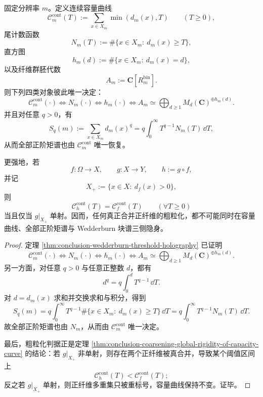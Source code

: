 \begin{theorem}\label{thm:conclusion-capacity-wedderburn-thermodynamic-completeness}
固定分辨率 \(m\)。定义连续容量曲线
\[
\mathcal C_m^{\mathrm{cont}}(T):=\sum_{x\in X_m}\min(d_m(x),T)
\qquad (T\ge 0),
\]
尾计数函数
\[
N_m(T):=\#\{x\in X_m:\ d_m(x)\ge T\},
\]
直方图
\[
h_m(d):=\#\{x\in X_m:\ d_m(x)=d\},
\]
以及纤维群胚代数
\[
A_m:=\mathbf C[R_m^{\mathrm{bin}}].
\]
则下列四类对象彼此唯一决定：
\[
\mathcal C_m^{\mathrm{cont}}(\cdot)
\Longleftrightarrow
N_m(\cdot)
\Longleftrightarrow
h_m(\cdot)
\Longleftrightarrow
A_m\simeq \bigoplus_{d\ge 1}M_d(\mathbf C)^{\oplus h_m(d)}.
\]
并且对任意 \(q>0\)，有
\[
S_q(m):=\sum_{x\in X_m}d_m(x)^q
=
q\int_0^\infty T^{q-1}N_m(T)\,\dd T,
\]
从而全部正阶矩谱也由 \(\mathcal C_m^{\mathrm{cont}}\) 唯一恢复。

更强地，若
\[
f:\Omega\to X,
\qquad
g:X\to Y,
\qquad
h:=g\circ f,
\]
并记
\[
X_+:=\{x\in X:\ d_f(x)>0\},
\]
则
\[
\mathcal C_h^{\mathrm{cont}}(T)=\mathcal C_f^{\mathrm{cont}}(T)
\qquad (\forall T\ge 0)
\]
当且仅当 \(g|_{X_+}\) 单射。因而，任何真正合并正纤维的粗粒化，都不可能同时在容量曲线、全部正阶矩谱与 Wedderburn 块谱三侧隐身。
\end{theorem}
\begin{proof}
定理 \ref{thm:conclusion-wedderburn-threshold-holography} 已证明
\[
\mathcal C_m^{\mathrm{cont}}(\cdot)
\Longleftrightarrow
N_m(\cdot)
\Longleftrightarrow
h_m(\cdot)
\Longleftrightarrow
A_m\simeq \bigoplus_{d\ge 1}M_d(\mathbf C)^{\oplus h_m(d)}.
\]
另一方面，对任意 \(q>0\) 与任意正整数 \(d\)，都有
\[
d^q=q\int_0^d T^{q-1}\,\dd T.
\]
对 \(d=d_m(x)\) 求和并交换求和与积分，得到
\[
S_q(m)
=
q\int_0^\infty T^{q-1}\#\{x\in X_m:\ d_m(x)\ge T\}\,\dd T
=
q\int_0^\infty T^{q-1}N_m(T)\,\dd T.
\]
故全部正阶矩谱也由 \(N_m\)，从而由 \(\mathcal C_m^{\mathrm{cont}}\) 唯一决定。

最后，粗粒化判据正是定理 \ref{thm:conclusion-coarsening-global-rigidity-of-capacity-curve} 的结论：若 \(g|_{X_+}\) 非单射，则存在两个正纤维被真合并，导致某个阈值区间上
\[
\mathcal C_h^{\mathrm{cont}}(T)<\mathcal C_f^{\mathrm{cont}}(T);
\]
反之若 \(g|_{X_+}\) 单射，则正纤维多重集只被重标号，容量曲线保持不变。证毕。
\end{proof}

